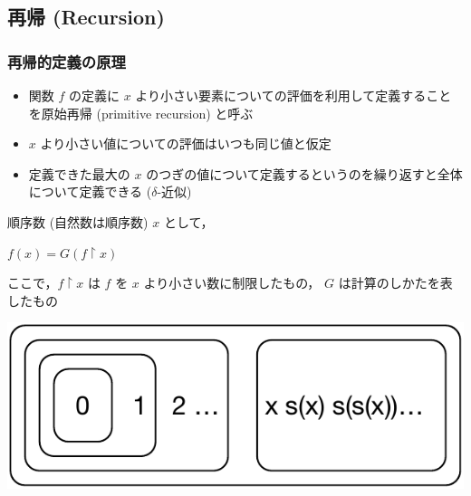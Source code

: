 \subsection{再帰 (Recursion)}
\begin{frame}[fragile]
\frametitle{再帰的定義の原理}
  \begin{itemize}
\item 関数 $f$ の定義に $x$ より小さい要素についての評価を利用して定義することを原始再帰 (primitive recursion) と呼ぶ
\item $x$ より小さい値についての評価はいつも同じ値と仮定
\item 定義できた最大の $x$ のつぎの値について定義するというのを繰り返すと全体について定義できる (\(\delta\)-近似)
  \end{itemize}
  \begin{theorem}[再帰の原理]
\scriptsize
順序数 (自然数は順序数) \(x\) として，
    \begin{center}
\(f(x)=G(f\upharpoonright x)\)
    \end{center}
ここで，\(f\upharpoonright x\) は \(f\) を \(x\) より小さい数に制限したもの， $G$ は計算のしかたを表したもの
  \end{theorem}
  \begin{center}
\includegraphics[scale=0.5]{./Figure/elementaryCS-2nd-figRecursion.pdf}
  \end{center}
\end{frame}
